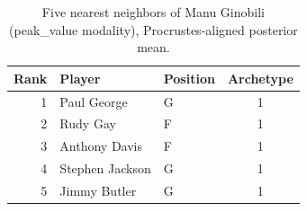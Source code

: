 \begin{table}[htbp]
  \centering\small
  \begin{tabular}{rllc}
    \toprule
    Rank & Player & Position & Archetype \\
    \midrule
    1 & Paul George & G & 1 \\
    2 & Rudy Gay & F & 1 \\
    3 & Anthony Davis & F & 1 \\
    4 & Stephen Jackson & G & 1 \\
    5 & Jimmy Butler & G & 1 \\
    \bottomrule
  \end{tabular}
  \caption{Five nearest neighbors of Manu Ginobili (peak_value modality), Procrustes-aligned posterior mean.}
  \label{tab:Manu_Ginobili_neighbors_peak_value}
\end{table}

